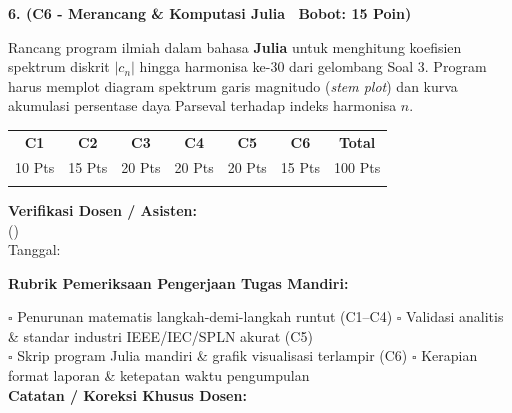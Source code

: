 \documentclass[10pt,a4paper]{article}
\begin{document}
\vspace{3.5mm}

\noindent\textbf{6. (C6 - Merancang \& Komputasi Julia \textbar\ Bobot: 15 Poin)}\par\vspace{0.8mm}
{\footnotesize Rancang program ilmiah dalam bahasa \textbf{Julia} untuk menghitung koefisien spektrum diskrit $|c_n|$ hingga harmonisa ke-30 dari gelombang Soal 3. Program harus memplot diagram spektrum garis magnitudo (\textit{stem plot}) dan kurva akumulasi persentase daya Parseval terhadap indeks harmonisa $n$.}\par

\vfill

\noindent\begin{minipage}[b]{0.62\textwidth}%
  \centering
  \scriptsize
  \begin{tabular}{|c|c|c|c|c|c|c|}
    \hline
    \rowcolor{unibblue}
    \textbf{\color{white}C1} & \textbf{\color{white}C2} & \textbf{\color{white}C3} & \textbf{\color{white}C4} & \textbf{\color{white}C5} & \textbf{\color{white}C6} & \textbf{\color{white}Total} \\
    \rowcolor{unibblue!10}
    10 Pts & 15 Pts & 20 Pts & 20 Pts & 20 Pts & 15 Pts & 100 Pts \\
    \hline
    & & & & & & \\[3mm]
    \hline
  \end{tabular}%
\end{minipage}%
\hfill%
\begin{minipage}[b]{0.35\textwidth}%
  \centering
  \scriptsize
  \textbf{Verifikasi Dosen / Asisten:}\\[6mm]
  (\dotfill)\\[1mm]
  \tiny Tanggal: \dotfill
\end{minipage}\par

\vspace{2mm}
\begin{tcolorbox}[colback=white,colframe=unibblue!40!black,colbacktitle=unibblue!10,coltitle=unibblue,boxrule=0.5pt,arc=2pt,left=5pt,right=5pt,top=3pt,bottom=3pt,title=\textbf{\tiny Catatan Evaluasi \& Umpan Balik Dosen Pengampu}]
  \tiny
  \textbf{Rubrik Pemeriksaan Pengerjaan Tugas Mandiri:}\par\vspace{0.8mm}
  $\square$ Penurunan matematis langkah-demi-langkah runtut (C1--C4) \hfill $\square$ Validasi analitis \& standar industri IEEE/IEC/SPLN akurat (C5)\\[0.8mm]
  $\square$ Skrip program Julia mandiri \& grafik visualisasi terlampir (C6) \hfill $\square$ Kerapian format laporan \& ketepatan waktu pengumpulan\\[2.0mm]
  \textbf{Catatan / Koreksi Khusus Dosen:}\\[1.6cm]
\end{tcolorbox}
\end{document}
